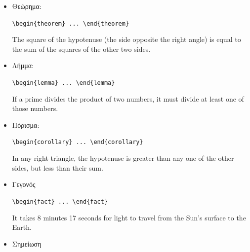 \begin{itemize}
	\item Θεώρημα:

	\begin{center}\verb"\begin{theorem} ... \end{theorem}"\end{center}

	\begin{theorem}
	Τhe square of the hypotenuse (the side opposite the right angle)
	is equal to the sum of the squares of the other two sides.
	\end{theorem}

	\item Λήμμα:

	\begin{center}\verb"\begin{lemma} ... \end{lemma}"\end{center}

	\begin{lemma}
	If a prime divides the product of two numbers, it must divide at least
	one of those numbers.
	\end{lemma}
	
	\item Πόρισμα:

	\begin{center}\verb"\begin{corollary} ... \end{corollary}"\end{center}
	
	\begin{corollary}
	In any right triangle, the hypotenuse is greater than any one of the
	other sides, but less than their sum.
	\end{corollary}
	
	\item Γεγονός
	
	\begin{center}\verb"\begin{fact} ... \end{fact}"\end{center}
	
	\begin{fact}
	It takes 8 minutes 17 seconds for light to travel from the Sun’s surface
	to the Earth.
	\end{fact}
	
	\item Σημείωση
	

\end{itemize}
